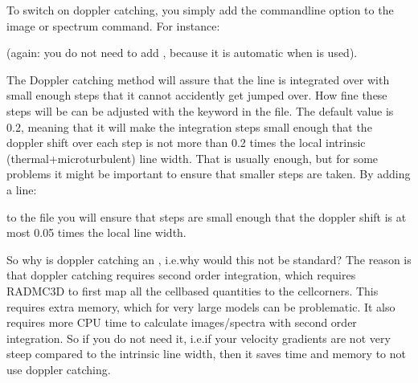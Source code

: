 \documentclass[letterpaper,10pt,english]{sphinxmanual}
\begin{document}
To switch on doppler catching, you simply add the command\sphinxhyphen{}line option
 to the image or spectrum command. For instance:

\begin{sphinxVerbatim}[commandchars=\\\{\}]
      
\end{sphinxVerbatim}

(again: you do not need to add , because it is automatic when
 is used).

The Doppler catching method will assure that the line is integrated over with
small enough steps that it cannot accidently get jumped over. How fine these
steps will be can be adjusted with the  keyword in
the  file. The default value is 0.2, meaning that it will make
the integration steps small enough that the doppler shift over each step is not
more than 0.2 times the local intrinsic (thermal+microturbulent) line
width. That is usually enough, but for some problems it might be important to
ensure that smaller steps are taken. By adding a line:

\begin{sphinxVerbatim}[commandchars=\\\{\}]
  
\end{sphinxVerbatim}

to the  file you will ensure that steps are small
enough that the doppler shift is at most 0.05 times the local line width.

So why is doppler catching an , i.e.why would this not be standard?
The reason is that doppler catching requires second order integration, which
requires RADMC\sphinxhyphen{}3D to first map all the cell\sphinxhyphen{}based quantities to the
cell\sphinxhyphen{}corners. This requires extra memory, which for very large models can be
problematic. It also requires more CPU time to calculate images/spectra with
second order integration. So if you do not need it, i.e.if your velocity
gradients are not very steep compared to the intrinsic line width, then it saves
time and memory to not use doppler catching.
\end{document}
